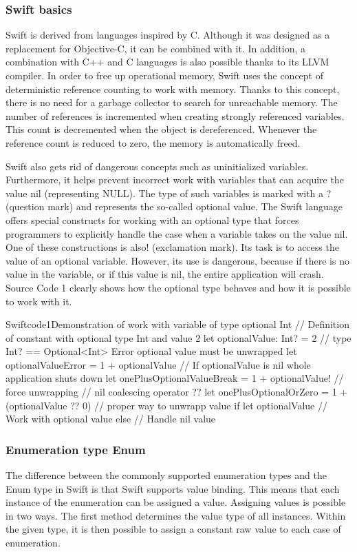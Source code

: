\documentclass[
  biblatex = false,
  language=english,
  figures=false,
  sourcecodes,
  glossaries,
  index
]{kidiplom}
\begin{document}
\subsubsection{Swift basics}
Swift is derived from languages inspired by C. Although it was designed as a replacement for Objective-C, it can be combined with it. In addition, a combination with C++ and C languages is also possible thanks to its LLVM compiler. In order to free up operational memory, Swift uses the concept of deterministic reference counting to work with memory. Thanks to this concept, there is no need for a garbage collector to search for unreachable memory. The number of references is incremented when creating strongly referenced variables. This count is decremented when the object is dereferenced. Whenever the reference count is reduced to zero, the memory is automatically freed.

Swift also gets rid of dangerous concepts such as uninitialized variables. Furthermore, it helps prevent incorrect work with variables that can acquire the value nil (representing NULL). The type of such variables is marked with a ? (question mark) and represents the so-called optional value. The Swift language offers special constructs for working with an optional type that forces programmers to explicitly handle the case when a variable takes on the value nil. One of these constructions is also! (exclamation mark). Its task is to access the value of an optional variable. However, its use is dangerous, because if there is no value in the variable, or if this value is nil, the entire application will crash. Source Code 1 clearly shows how the optional type behaves and how it is possible to work with it.

\begin{kicode}{Swift}{code1}{Demonstration of work with variable of type optional Int}
// Definition of constant with optional type Int and value 2
let optionalValue: Int? = 2 // type Int? == Optional<Int>
Error optional value must be unwrapped
let optionalValueError = 1 + optionalValue
// If optionalValue is nil whole application shuts down
let onePlusOptionalValueBreak = 1 + optionalValue! // force unwrapping
// nil coalescing operator ??
let onePlusOptionalOrZero = 1 + (optionalValue ?? 0)
// proper way to unwrapp value
if let optionalValue {
// Work with optional value
} else {
// Handle nil value
}
\end{kicode}

\subsubsection{Enumeration type Enum}
The difference between the commonly supported enumeration types and the Enum type in Swift is that Swift supports value binding. This means that each instance of the enumeration can be assigned a value. Assigning values is possible in two ways. The first method determines the value type of all instances. Within the given type, it is then possible to assign a constant raw value to each case of enumeration.
\end{document}
